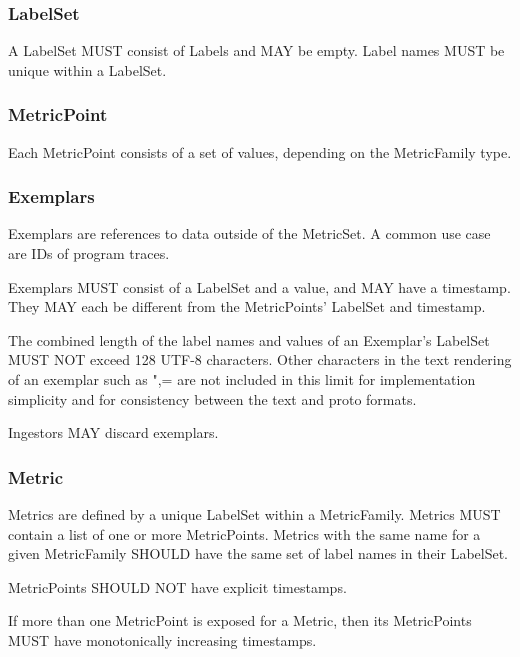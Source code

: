 \documentclass[a4paper,12pt,notitlepage,twoside,openright]{article}
\begin{document}
\hypertarget{labelset}{%
\subsubsection{LabelSet}\label{labelset}}

A LabelSet MUST consist of Labels and MAY be empty. Label names MUST be
unique within a LabelSet.

\hypertarget{metricpoint}{%
\subsubsection{MetricPoint}\label{metricpoint}}

Each MetricPoint consists of a set of values, depending on the
MetricFamily type.

\hypertarget{exemplars}{%
\subsubsection{Exemplars}\label{exemplars}}

Exemplars are references to data outside of the MetricSet. A common use
case are IDs of program traces.

Exemplars MUST consist of a LabelSet and a value, and MAY have a
timestamp. They MAY each be different from the MetricPoints' LabelSet
and timestamp.

The combined length of the label names and values of an Exemplar's
LabelSet MUST NOT exceed 128 UTF-8 characters. Other characters in the
text rendering of an exemplar such as ",= are not included in this limit
for implementation simplicity and for consistency between the text and
proto formats.

Ingestors MAY discard exemplars.

\hypertarget{metric}{%
\subsubsection{Metric}\label{metric}}

Metrics are defined by a unique LabelSet within a MetricFamily. Metrics
MUST contain a list of one or more MetricPoints. Metrics with the same
name for a given MetricFamily SHOULD have the same set of label names in
their LabelSet.

MetricPoints SHOULD NOT have explicit timestamps.

If more than one MetricPoint is exposed for a Metric, then its
MetricPoints MUST have monotonically increasing timestamps.
\end{document}
